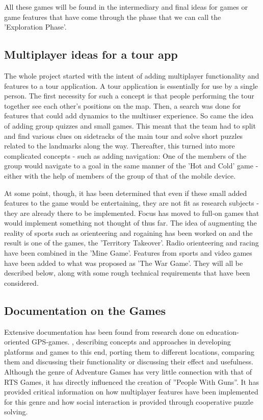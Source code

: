 All these games will be found in the intermediary and final ideas for games or
game features that have come through the phase that we can call the
'Exploration Phase'.


\subsection{Multiplayer ideas for a tour app}

The whole project started with the intent of adding multiplayer functionality
and features to a tour application. A tour application is essentially for use by
a single person. The first necessity for such a concept is that people
performing the tour together see each other's positions on the map. Then, a
search was done for features that could add dynamics to the multiuser
experience. So came the idea of adding group quizzes and small games. This meant
that the team had to split and find various clues on sidetracks of the main tour
and solve short puzzles related to the landmarks along the way. Thereafter, this
turned into more complicated concepts - such as adding navigation: One of the
members of the group would navigate to a goal in the same manner of the 'Hot and
Cold' game - either with the help of members of the group of that of the mobile
device.\newline

At some point, though, it has been determined that even if these small added
features to the game would be entertaining, they are not fit as research
subjects - they are already there to be implemented. Focus has moved to full-on
games that would implement something not thought of thus far. The idea of
augmenting the reality of sports such as orienteering and rogaining has been
worked on and the result is one of the games, the 'Territory Takeover'. Radio
orienteering and racing have been combined in the 'Mine Game'. Features from
sports and video games have been added to what was proposed as 'The War Game'.
They will all be described below, along with some rough technical requirements
that have been considered.

\subsection{Documentation on the Games}
Extensive documentation has been found from research done on education-oriented
GPS-games.\cite{pbarg1} \cite{pbarg2} \cite{pbarg3} \cite{pbarg4} \cite{pbarg5}
\cite{pbarg6}, describing concepts and approaches in developing platforms and
games to this end\cite{pbarg3}, porting them to different
locations\cite{pbarg4}, comparing them and discussing their
functionality\cite{pbarg6} \cite{pbarg1} \cite{pbarg2} or discussing their
effect and usefulness\cite{pbarg1}. Although the genre of Adventure
Games has very little connection with that of RTS Games, it has directly
influenced the creation of ''People With Guns''. It has provided critical
information on how multiplayer features have been implemented for this genre and
how social interaction is provided through cooperative puzzle solving.


